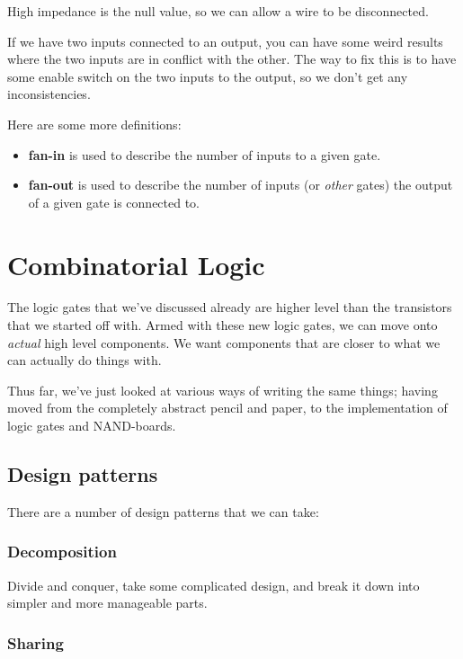 \documentclass[11pt,a4paper,titlepage,dvipsnames,cmyk]{scrartcl}
\begin{document}
High impedance is the null value, so we can allow a wire to be
disconnected.

If we have two inputs connected to an output, you can have some weird
results where the two inputs are in conflict with the other. The way to
fix this is to have some enable switch on the two inputs to the output, so
we don't get any inconsistencies.

Here are some more definitions:
\begin{itemize}
    \item \textbf{fan-in} is used to describe the number of inputs to a
        given gate.
    \item \textbf{fan-out} is used to describe the number of inputs (or
        \textit{other} gates) the output of a given gate is connected to.
\end{itemize}

\section{Combinatorial Logic}%
\label{sec:combinatorial}

The logic gates that we've discussed already are higher level than the
transistors that we started off with. Armed with these new logic gates, we
can move onto \textit{actual} high level components. We want components
that are closer to what we can actually do things with.

Thus far, we've just looked at various ways of writing the same things;
having moved from the completely abstract pencil and paper, to the
implementation of logic gates and NAND-boards.

\subsection{Design patterns}%
\label{sub:patterns}
There are a number of design patterns that we can take:

\subsubsection{Decomposition}%
\label{ssub:Decomposition}

Divide and conquer, take some complicated design, and break it down into
simpler and more manageable parts.

\subsubsection{Sharing}%
\label{ssub:Sharing}
\end{document}

